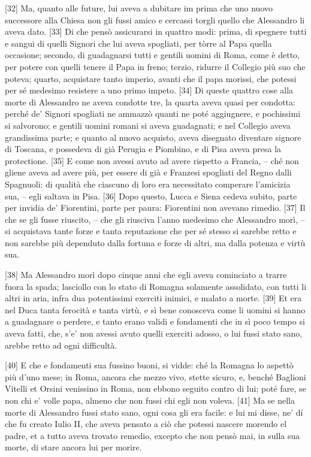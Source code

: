 {[}32{]} Ma, quanto alle future, lui aveva a dubitare im prima che uno
nuovo successore alla Chiesa non gli fussi amico e cercassi torgli
quello che Alessandro li aveva dato. {[}33{]} Di che pensò assicurarsi
in quattro modi: prima, di spegnere tutti e sangui di quelli Signori che
lui aveva spogliati, per tòrre al Papa quella occasione; secondo, di
guadagnarsi tutti e gentili uomini di Roma, come è detto, per potere con
quelli tenere il Papa in freno; terzio, ridurre il Collegio più suo che
poteva; quarto, acquistare tanto imperio, avanti che il papa morissi,
che potessi per sé medesimo resistere a uno primo impeto. {[}34{]} Di
queste quattro cose alla morte di Alessandro ne aveva condotte tre, la
quarta aveva quasi per condotta: perché de' Signori spogliati ne ammazzò
quanti ne poté aggiugnere, e pochissimi si salvorono; e gentili uomini
romani si aveva guadagnati; e nel Collegio aveva grandissima parte; e
quanto al nuovo acquisto, aveva disegnato diventare signore di Toscana,
e possedeva di già Perugia e Piombino, e di Pisa aveva presa la
protectione. {[}35{]} E come non avessi avuto ad avere rispetto a
Francia, -- ché non gliene aveva ad avere più, per essere di già e
Franzesi spogliati del Regno dalli Spagnuoli: di qualità che ciascuno di
loro era necessitato comperare l'amicizia sua, -- egli saltava in Pisa.
{[}36{]} Dopo questo, Lucca e Siena cedeva subito, parte per invidia de'
Fiorentini, parte per paura: Fiorentini non avevano rimedio. {[}37{]} Il
che se gli fusse riuscito, -- che gli riusciva l'anno medesimo che
Alessandro morì, -- si acquistava tante forze e tanta reputazione che
per sé stesso si sarebbe retto e non sarebbe più dependuto dalla fortuna
e forze di altri, ma dalla potenza e virtù sua.

{[}38{]} Ma Alessandro morì dopo cinque anni che egli aveva cominciato a
trarre fuora la spada; lasciollo con lo stato di Romagna solamente
assolidato, con tutti li altri in aria, infra dua potentissimi exerciti
inimici, e malato a morte. {[}39{]} Et era nel Duca tanta ferocità e
tanta virtù, e sì bene conosceva come li uomini si hanno a guadagnare o
perdere, e tanto erano validi e fondamenti che in sì poco tempo si aveva
fatti, che, s'e' non avessi avuto quelli exerciti adosso, o lui fussi
stato sano, arebbe retto ad ogni difficultà.

{[}40{]} E che e fondamenti sua fussino buoni, si vidde: ché la Romagna
lo aspettò più d'uno mese; in Roma, ancora che mezzo vivo, stette
sicuro, e, benché Baglioni Vitelli et Orsini venissino in Roma, non
ebbono seguito contro di lui; poté fare, se non chi e' volle papa,
almeno che non fussi chi egli non voleva. {[}41{]} Ma se nella morte di
Alessandro fussi stato sano, ogni cosa gli era facile: e lui mi disse,
ne' dí che fu creato Iulio II, che aveva pensato a ciò che potessi
nascere morendo el padre, et a tutto aveva trovato remedio, excepto che
non pensò mai, in sulla sua morte, di stare ancora lui per morire.

